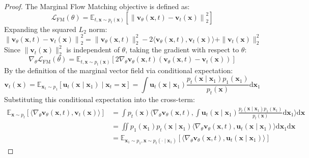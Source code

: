 \documentclass[11pt,a4paper]{article}
\theoremstyle{definition}
\begin{document}
\begin{proof}
The Marginal Flow Matching objective is defined as:
{\boldmath
\begin{equation}
\mathcal{L}_{\text{FM}}(\theta) = \mathbb{E}_{t, \mathbf{x} \sim p_t(\mathbf{x})}\left[ \left\| \mathbf{v}_\theta(\mathbf{x}, t) - \mathbf{v}_t(\mathbf{x}) \right\|_2^2 \right]
\end{equation}
}
Expanding the squared $L_2$ norm:
{\boldmath
\begin{equation}
\left\| \mathbf{v}_\theta(\mathbf{x}, t) - \mathbf{v}_t(\mathbf{x}) \right\|_2^2 = \|\mathbf{v}_\theta(\mathbf{x}, t)\|_2^2 - 2 \langle \mathbf{v}_\theta(\mathbf{x}, t), \mathbf{v}_t(\mathbf{x}) \rangle + \|\mathbf{v}_t(\mathbf{x})\|_2^2
\end{equation}
}
Since $\|\mathbf{v}_t(\mathbf{x})\|_2^2$ is independent of $\theta$, taking the gradient with respect to $\theta$:
{\boldmath
\begin{equation}
\nabla_\theta \mathcal{L}_{\text{FM}}(\theta) = \mathbb{E}_{t, \mathbf{x} \sim p_t(\mathbf{x})}\left[ 2 \nabla_\theta \mathbf{v}_\theta(\mathbf{x}, t) \left( \mathbf{v}_\theta(\mathbf{x}, t) - \mathbf{v}_t(\mathbf{x}) \right) \right]
\end{equation}
}
By the definition of the marginal vector field via conditional expectation:
{\boldmath
\begin{equation}
\mathbf{v}_t(\mathbf{x}) = \mathbb{E}_{\mathbf{x}_1 \sim p_1}\left[ \mathbf{u}_t(\mathbf{x} \mid \mathbf{x}_1) \mid \mathbf{x}_t = \mathbf{x} \right] = \int \mathbf{u}_t(\mathbf{x} \mid \mathbf{x}_1) \frac{p_t(\mathbf{x} \mid \mathbf{x}_1) p_1(\mathbf{x}_1)}{p_t(\mathbf{x})} \mathrm{d}\mathbf{x}_1
\end{equation}
}
Substituting this conditional expectation into the cross-term:
{\boldmath
\begin{align}
\mathbb{E}_{\mathbf{x} \sim p_t}\left[ \langle \nabla_\theta \mathbf{v}_\theta(\mathbf{x}, t), \mathbf{v}_t(\mathbf{x}) \rangle \right] &= \int p_t(\mathbf{x}) \langle \nabla_\theta \mathbf{v}_\theta(\mathbf{x}, t), \int \mathbf{u}_t(\mathbf{x} \mid \mathbf{x}_1) \frac{p_t(\mathbf{x} \mid \mathbf{x}_1) p_1(\mathbf{x}_1)}{p_t(\mathbf{x})} \mathrm{d}\mathbf{x}_1 \rangle \mathrm{d}\mathbf{x} \\
&= \iint p_1(\mathbf{x}_1) p_t(\mathbf{x} \mid \mathbf{x}_1) \langle \nabla_\theta \mathbf{v}_\theta(\mathbf{x}, t), \mathbf{u}_t(\mathbf{x} \mid \mathbf{x}_1) \rangle \mathrm{d}\mathbf{x}_1 \mathrm{d}\mathbf{x} \\
&= \mathbb{E}_{\mathbf{x}_1 \sim p_1, \mathbf{x} \sim p_t(\cdot \mid \mathbf{x}_1)}\left[ \langle \nabla_\theta \mathbf{v}_\theta(\mathbf{x}, t), \mathbf{u}_t(\mathbf{x} \mid \mathbf{x}_1) \rangle \right]

\end{align}}
\end{proof}
\end{document}
